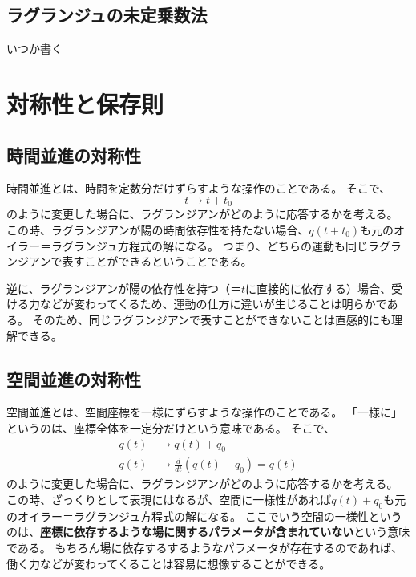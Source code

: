 \documentclass[a4paper]{jsreport}
\begin{document}
        \section{ラグランジュの未定乗数法}
            いつか書く

    \chapter{対称性と保存則}
        \section{時間並進の対称性}
            時間並進とは、時間を定数分だけずらすような操作のことである。
            そこで、
            \begin{equation}
                t \to t + t_0
            \end{equation}
            のように変更した場合に、ラグランジアンがどのように応答するかを考える。
            この時、ラグランジアンが陽の時間依存性を持たない場合、$q(t+t_0)$も元のオイラー＝ラグランジュ方程式の解になる。
            つまり、どちらの運動も同じラグランジアンで表すことができるということである。\par
            逆に、ラグランジアンが陽の依存性を持つ（＝$t$に直接的に依存する）場合、受ける力などが変わってくるため、運動の仕方に違いが生じることは明らかである。
            そのため、同じラグランジアンで表すことができないことは直感的にも理解できる。

        \section{空間並進の対称性}
            空間並進とは、空間座標を一様にずらすような操作のことである。
            「一様に」というのは、座標全体を一定分だけという意味である。
            そこで、
            \begin{align}
                q(t) &\to q(t) + q_0 \\
                \dot{q}(t) &\to \frac{d}{dt} ({q(t)} + q_0) = \dot{q}(t)
            \end{align}
            のように変更した場合に、ラグランジアンがどのように応答するかを考える。
            この時、ざっくりとして表現にはなるが、空間に一様性があれば$q(t) + q_0$も元のオイラー＝ラグランジュ方程式の解になる。
            ここでいう空間の一様性というのは、\textbf{座標に依存するような場に関するパラメータが含まれていない}という意味である。
            もちろん場に依存するするようなパラメータが存在するのであれば、働く力などが変わってくることは容易に想像することができる。
\end{document}
